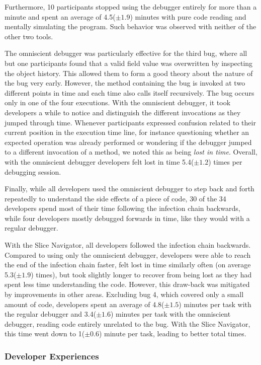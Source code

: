 \documentclass[
			english,
			]{elsarticle}
\begin{document}
Furthermore, 10 participants stopped using the debugger entirely for more than a minute and spent an average of 4.5($\pm1.9$) minutes with pure code reading and mentally simulating the program.
Such behavior was observed with neither of the other two tools.

The omniscient debugger was particularly effective for the third bug, where all but one participants found that a valid field value was overwritten by inspecting the object history.
This allowed them to form a good theory about the nature of the bug very early.
However, the method containing the bug is invoked at two different points in time and each time also calls itself recursively.
The bug occurs only in one of the four executions.
With the omniscient debugger, it took developers a while to notice and distinguish the different invocations as they jumped through time.
Whenever participants expressed confusion related to their current position in the execution time line,
for instance questioning whether an expected operation was already performed or wondering if the debugger jumped to a different invocation of a method, we noted this as being \emph{lost in time}.
Overall, with the omniscient debugger developers felt lost in time 5.4($\pm1.2$) times per debugging session.

Finally, while all developers used the omniscient debugger to step back and forth repeatedly to understand the side effects of a piece of code, 30 of the 34 developers spend most of their time following the infection chain backwards, while four developers mostly debugged forwards in time, like they would with a regular debugger.

With the Slice Navigator, all developers followed the infection chain backwards.
Compared to using only the omniscient debugger, developers were able to reach the end of the infection chain faster, felt lost in time similarly often (on average 5.3($\pm1.9$) times), but took slightly longer to recover from being lost as they had spent less time understanding the code.
However, this draw-back was mitigated by improvements in other areas.
Excluding bug 4, which covered only a small amount of code, developers spent an average of 4.8($\pm1.5$) minutes per task with the regular debugger and 3.4($\pm1.6$) minutes per task with the omniscient debugger, reading code entirely unrelated to the bug.
With the Slice Navigator, this time went down to 1($\pm0.6$) minute per task, leading to better total times.

\subsubsection{Developer Experiences}
\end{document}
